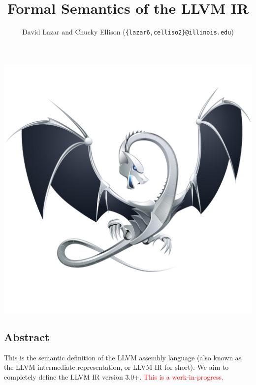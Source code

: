 \setlength{\parindent}{1em}
\title{Formal Semantics of the LLVM IR}
\author{David Lazar and Chucky Ellison (\texttt{\{lazar6,celliso2\}@illinois.edu})}

\maketitle

\setlength{\parindent}{8em}
\includegraphics[scale=0.27]{latex/dragon.pdf}
\setlength{\parindent}{1em}

\begin{kblock}[text]
\section{Abstract}
This is the \K semantic definition of the LLVM assembly language (also known as the LLVM intermediate representation, or LLVM IR for short).
We aim to completely define the LLVM IR version 3.0+.
\textcolor{red}{This is a work-in-progress.}
\end{kblock}
